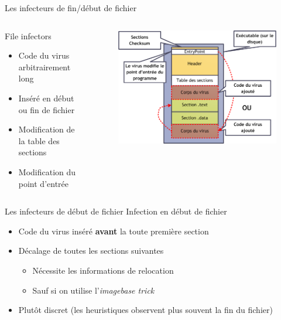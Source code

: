 \documentclass{beamer}
\begin{document}
\begin{frame}{Les infecteurs de fin/début de fichier}
\begin{columns}[t]
\begin{column}{4cm}
\begin{exampleblock}{File infectors}
\begin{itemize}
\item Code du virus arbitrairement long
\item Inséré en début ou fin de fichier
\item Modification de la table des sections
\item Modification du point d'entrée
\end{itemize}
\end{exampleblock}
\end{column}
\begin{column}{6cm}
\begin{figure}[!ht]
\includegraphics[scale=0.3]{appender.png}
\center
\end{figure}
\end{column}
\end{columns}
\end{frame}

\begin{frame}{Les infecteurs de début de fichier}
Infection en début de fichier
\begin{itemize}
\item Code du virus inséré \textbf{avant} la toute première section
\item Décalage de toutes les sections suivantes
\begin{itemize}
\item Nécessite les informations de relocation
\item Sauf si on utilise l'\textit{imagebase trick}
\end{itemize}
\item Plutôt discret (les heuristiques observent plus souvent la fin du fichier)
\end{itemize}
\end{frame}
\end{document}
